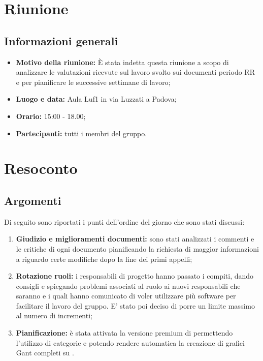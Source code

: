 \documentclass[VER-2018-01-29.tex]{subfiles}
\begin{document}
\chapter{Riunione}

\section{Informazioni generali}	
\begin{itemize}
	\item \textbf{Motivo della riunione:} \`{E} stata indetta questa riunione a scopo di analizzare le valutazioni ricevute sul lavoro svolto sui documenti periodo RR e per pianificare le successive settimane di lavoro;
	\item \textbf{Luogo e data:} Aula Luf1 in via Luzzati a Padova;
	\item \textbf{Orario:} 15:00 - 18.00;
	\item \textbf{Partecipanti:} tutti i membri del gruppo.
\end{itemize}

\chapter{Resoconto}

\section{Argomenti}	
Di seguito sono riportati i punti dell'ordine del giorno che sono stati discussi:
\begin{enumerate}
	\item \textbf{Giudizio e miglioramenti documenti:} sono stati analizzati i commenti e le critiche di ogni documento pianificando la richiesta di maggior informazioni a \Vardanega riguardo certe modifiche dopo la fine dei primi appelli;
	
	\item \textbf{Rotazione ruoli:} i responsabili di progetto hanno passato i compiti, dando consigli e spiegando problemi associati al ruolo ai nuovi responsabili che saranno \Davide{} e \Riccardo{} i quali hanno comunicato di voler utilizzare più software per facilitare il lavoro del gruppo.
	E' stato poi deciso di porre un limite massimo al numero di incrementi;
	
	\item \textbf{Pianificazione:} è stata attivata la versione premium di  permettendo l'utilizzo di categorie e potendo rendere automatica la creazione di grafici Gant completi su . 
	
	 
\end{enumerate} 
\end{document}
